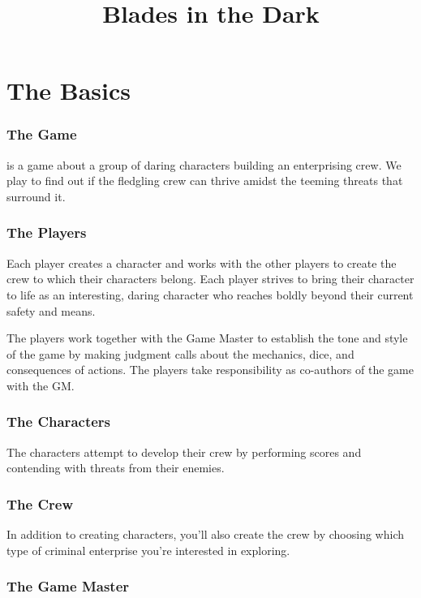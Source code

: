 \documentclass[11pt,fleqn,a5paper]{book}
\title{Blades in the Dark}
\begin{document}
\maketitle

\tableofcontents

\part{The Basics}

\section{The Game}

\thetitle{} is a game about a group of daring characters building an enterprising crew. We play to find out if the fledgling crew can thrive amidst the teeming threats that surround it.

\section{The Players}

Each player creates a character and works with the other players to create the crew to which their characters belong. Each player strives to bring their character to life as an interesting, daring character who reaches boldly beyond their current safety and means.

The players work together with the Game Master to establish the tone and style of the game by making judgment calls about the mechanics, dice, and consequences of actions. The players take responsibility as co-authors of the game with the GM.

\section{The Characters}

The characters attempt to develop their crew by performing scores and contending with threats from their enemies.

\section{The Crew}

In addition to creating characters, you’ll also create the crew by choosing which type of criminal enterprise you’re interested in exploring.

\section{The Game Master}
\end{document}
